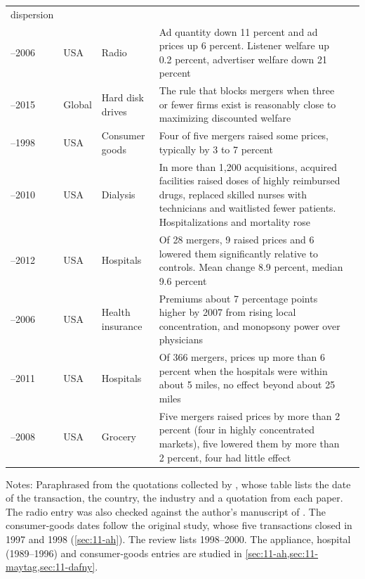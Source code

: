 \begin{table}[htbp]
\begin{tabularx}{\textwidth}{@{}>{\raggedright\arraybackslash}p{1.45cm}>{\raggedright\arraybackslash}p{1.16cm}%
>{\raggedright\arraybackslash}p{1.91cm}>{\raggedright\arraybackslash}X>{\raggedright\arraybackslash}p{2.15cm}@{}}
dispersion & \citet{AllenClarkHoude2014} \\
1996--2006 & USA & Radio & Ad quantity down 11 percent and ad prices up 6 percent. Listener welfare up 0.2 percent,
advertiser welfare down 21 percent & \citet{Jeziorski2014} \\
1996--2015 & Global & Hard disk drives & The rule that blocks mergers when three or fewer firms exist is reasonably
close to maximizing discounted welfare & \citet{IgamiUetake2019} \\
1997--1998 & USA & Consumer goods & Four of five mergers raised some prices, typically by 3 to 7 percent &
\citet{AshenfelterHosken2010} \\
1997--2010 & USA & Dialysis & In more than 1,200 acquisitions, acquired facilities raised doses of highly reimbursed
drugs, replaced skilled nurses with technicians and waitlisted fewer patients. Hospitalizations and mortality rose &
\citet{EliasonEtAl2020} \\
1997--2012 & USA & Hospitals & Of 28 mergers, 9 raised prices and 6 lowered them significantly relative to
controls. Mean change 8.9 percent, median 9.6 percent & \citet{Garmon2017} \\
1998--2006 & USA & Health insurance & Premiums about 7 percentage points higher by 2007 from rising local
concentration, and monopsony power over physicians & \citet{DafnyDugganRamanarayanan2012} \\
2007--2011 & USA & Hospitals & Of 366 mergers, prices up more than 6 percent when the hospitals were within about 5
miles, no effect beyond about 25 miles & \citet{CooperEtAl2019} \\
2007--2008 & USA & Grocery & Five mergers raised prices by more than 2 percent (four in highly concentrated
markets), five lowered them by more than 2 percent, four had little effect & \citet{HoskenOlsonSmith2018} \\
\bottomrule
\end{tabularx}

\vspace{3pt}
\begin{minipage}{\textwidth}
\footnotesize Notes: Paraphrased from the quotations collected by \citet[Appendix A, pp.~262--265]{AskerNocke2021},
whose table lists the date of the transaction, the country, the industry and a quotation from each paper. The
radio entry was also checked against the author's manuscript of \citet{Jeziorski2014}. The consumer-goods dates
follow the original study, whose five transactions closed in 1997 and 1998 (\cref{sec:11-ah}). The review lists
1998--2000. The appliance, hospital
(1989--1996) and consumer-goods entries are studied in \cref{sec:11-ah,sec:11-maytag,sec:11-dafny}.
\end{minipage}
\end{table}


